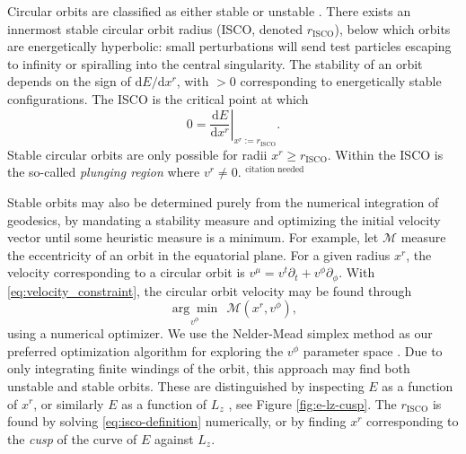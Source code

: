 \documentclass[fleqn,usenatbib]{mnras}
\newcommand{\citneeded}{{\bf \color{red} $^{\text{citation needed}}$}}
\renewcommand{\d}{\text{d}}
\newcommand{\risco}{r_\text{ISCO}}
\begin{document}
Circular orbits are classified as either stable or unstable
\citep{wilkins_bound_1972,bardeen_rotating_1972}. There exists an innermost
stable circular orbit radius (ISCO, denoted $\risco$), below which orbits
are energetically hyperbolic: small perturbations will send test particles
escaping to infinity or spiralling into the central singularity. The stability of
an orbit depends on the sign of $\d E / \d x^r$, with $>0$ corresponding to
energetically stable configurations. The ISCO is the critical point at
which
\begin{equation}
    \label{eq:isco-definition}
    0 = \left. \frac{\d E}{\d x^r} \right\rvert_{x^r := \risco}.
\end{equation}
Stable circular orbits are only possible for radii $x^r \geq \risco$.
Within the ISCO is the so-called \textit{plunging region} where $v^r \neq 0$.
\citneeded

Stable orbits may also be determined purely from the numerical integration of
geodesics, by mandating a stability measure and optimizing the initial velocity
vector until some heuristic measure is a minimum. For example, let $\mathscr{M}$
measure the eccentricity of an orbit in the equatorial plane. For a given radius
$x^r$, the velocity corresponding to a circular orbit is $v^\mu = v^t \partial_t
+ v^\phi \partial_\phi $. With \eqref{eq:velocity_constraint}, the circular
orbit velocity may be found through
\begin{equation}
    \underset{v^\phi}{\arg \min}\ \ \mathscr{M}(x^r, v^\phi),
\end{equation}
using a numerical optimizer. We use the Nelder-Mead simplex method as our
preferred optimization algorithm for exploring the $v^\phi$ parameter space
\citep{nelder_simplex_1965}. Due to only integrating finite windings of the
orbit, this approach may find both unstable and stable orbits. These are
distinguished by inspecting $E$ as a function of $x^r$, or similarly $E$ as a
function of $L_z$ \citep{hackmann_charged_2013}, see Figure \ref{fig:e-lz-cusp}.
The $\risco$ is found by solving \eqref{eq:isco-definition} numerically, or
by finding $x^r$ corresponding to the \emph{cusp} of the curve of  $E$ against
$L_z$.
\end{document}
